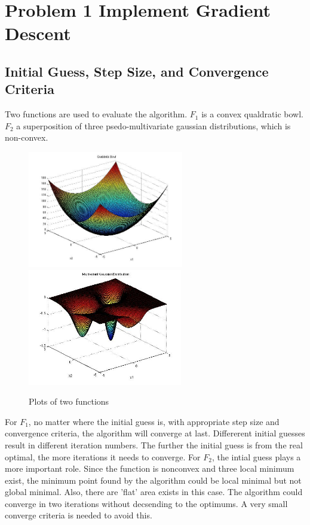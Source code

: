 \section{Problem 1 Implement Gradient Descent}

\subsection{Initial Guess, Step Size, and Convergence Criteria}
Two functions are used to evaluate the algorithm. $F_1$ is a convex qualdratic bowl.  $F_2$ a superposition of three psedo-multivariate gaussian distributions, which is non-convex.

\begin{figure}[h]
 \centering
\includegraphics[height=2in]{figures/p1_QualdraticBowl} 
\includegraphics[height=2in]{figures/p1_MultivariantGaussian} 
    \caption{Plots of two functions}
    \label{fig:functions}
\end{figure}

For $F_1$, no matter where the initial guess is, with appropriate step size and convergence criteria, the algorithm will converge at last. Differerent initial guesses result in different iteration numbers. The further the initial guess is from the real optimal, the more iterations it needs to converge. For $F_2$, the intial guess plays a more important role. Since the function is nonconvex and three local minimum exist, the minimum point found by the algorithm could be local minimal but not global minimal. Also, there are 'flat' area exists in this case. The algorithm could converge in two iterations without decsending to the optimums. A very small converge criteria is needed to avoid this. 

